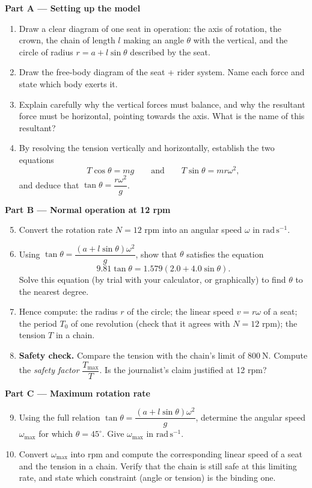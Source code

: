 \documentclass[11pt]{article}
\begin{document}
\textbf{Part A — Setting up the model}

\begin{enumerate}
\item Draw a clear diagram of one seat in operation: the axis of rotation, the crown, the chain of length $l$ making an angle $\theta$ with the vertical, and the circle of radius $r = a + l\sin\theta$ described by the seat.
\item Draw the free-body diagram of the seat + rider system. Name each force and state which body exerts it.
\item Explain carefully why the vertical forces must balance, and why the resultant force must be horizontal, pointing towards the axis. What is the name of this resultant?
\item By resolving the tension vertically and horizontally, establish the two equations
\[ T\cos\theta = mg \qquad \text{and} \qquad T\sin\theta = m r \omega^2, \]
and deduce that $\tan\theta = \dfrac{r\omega^2}{g}$.
\end{enumerate}

\textbf{Part B — Normal operation at 12 rpm}

\begin{enumerate}
\setcounter{enumi}{4}
\item Convert the rotation rate $N = 12$ rpm into an angular speed $\omega$ in $\mathrm{rad\,s^{-1}}$.
\item Using $\tan\theta = \dfrac{(a + l\sin\theta)\omega^2}{g}$, show that $\theta$ satisfies the equation
\[ 9.81\tan\theta = 1.579\left(2.0 + 4.0\sin\theta\right). \]
Solve this equation (by trial with your calculator, or graphically) to find $\theta$ to the nearest degree.
\item Hence compute: the radius $r$ of the circle; the linear speed $v = r\omega$ of a seat; the period $T_0$ of one revolution (check that it agrees with $N = 12$ rpm); the tension $T$ in a chain.
\item \textbf{Safety check.} Compare the tension with the chain's limit of $800\ \mathrm{N}$. Compute the \emph{safety factor} $\dfrac{T_{\max}}{T}$. Is the journalist's claim justified at 12 rpm?
\end{enumerate}

\textbf{Part C — Maximum rotation rate}

\begin{enumerate}
\setcounter{enumi}{8}
\item Using the full relation $\tan\theta = \dfrac{(a + l\sin\theta)\omega^2}{g}$, determine the angular speed $\omega_{\max}$ for which $\theta = 45^{\circ}$. Give $\omega_{\max}$ in $\mathrm{rad\,s^{-1}}$.
\item Convert $\omega_{\max}$ into rpm and compute the corresponding linear speed of a seat and the tension in a chain. Verify that the chain is still safe at this limiting rate, and state which constraint (angle or tension) is the binding one.
\end{enumerate}
\end{document}
